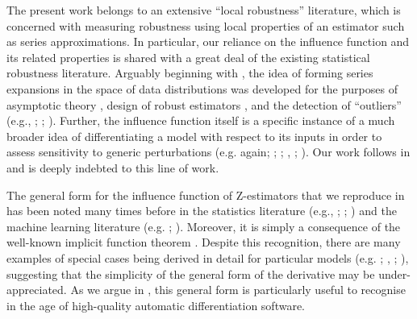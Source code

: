 The present work belongs to an extensive ``local robustness'' literature, which
is concerned with measuring robustness using local properties of an estimator
such as series approximations.  In particular, our reliance on the influence
function and its related properties is shared with a great deal of the existing
statistical robustness literature.  Arguably beginning with
\citet{mises1947asymptotic}, the idea of forming series expansions in the space
of data distributions was developed for the purposes of asymptotic theory
\citep[e.g.][]{jaeckel:1972:infinitesimal,reeds1976thesis,fernholz:1983:mises,vaart:1996:empiricalprocesses},
design of robust estimators \citep[e.g.][chapter
2.4]{hampel1974influence,hampel1986robustbook}, and the detection of
``outliers''
(e.g., \citealt[chapter 2]{belsley:1980:regression};
\citealt{cain:1984:approximatecaseinfluence}; \citealt{cook:1986:assessment}).
Further, the influence function itself is a specific instance of a much broader
idea of differentiating a model with respect to its inputs in order to assess
sensitivity to generic perturbations (e.g. \citealt{cook:1986:assessment} again;
\citealt{diaconis:1986:bayesconsistency};
\citealt{ruggeri:1993:infinitesimalposteriorsensitivity};
\citealt{basu:1996:local}, \citealt{gustafson:2012:localrobustnessbook};
\citealt{giordano2022bnp}). Our work follows in and is deeply indebted to this line
of work.

The general form for the influence function of Z-estimators that we reproduce
in  has been noted many times before in the statistics
literature (e.g., \citealt[chapter 3.4]{hampel1986robustbook};
\citealt{taylor:1993:unifiedapproachtoinfluentialdata}; \citealt[example
20.4]{vaart2000asymptotic}) and the machine learning literature (e.g.
\citealt{koh:2017:blackbox}; \citealt{giordano:2019:swiss}). Moreover, it is 
simply a consequence of the well-known implicit function theorem
\citep{krantz2012implicit}.  Despite this recognition, there are many examples
of special cases being derived in detail for particular models (e.g.
\citealt{pregibon:1981:logistic}; \citealt{thomas:1989:assessing},
\citealt{hattori:2009:ipcqcasedeletion}; \citealt{shi:2016:gmmcasedeletion}),
suggesting that the simplicity of the general form of the derivative may be
under-appreciated. As we argue in , this general form is
particularly useful to recognise in the age of high-quality automatic
differentiation software.

